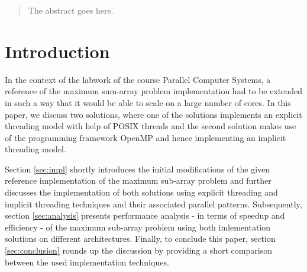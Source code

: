 \documentclass[conference]{IEEEtran}
\begin{document}
\begin{abstract}
The abstract goes here.
\end{abstract}





%
\IEEEpeerreviewmaketitle



\section{Introduction}
In the context of the labwork of the course Parallel Computer Systems, a reference of the maximum sum-array problem implementation had to be extended in such a way that it would be able to scale on a large number of cores. In this paper, we discuss two solutions, where one of the solutions implements an explicit threading model with help of POSIX threads and the second solution makes use of the programming framework OpenMP and hence implementing an implicit threading model. 

Section \ref{sec:impl} shortly introduces the initial modifications of the given reference implementation of the maximum sub-array problem and further discusses the implementation of both solutions using explicit threading and implicit threading techniques and their associated parallel patterns. Subsequently, section \ref{sec:analysis} presents performance analysis - in terms of speedup and efficiency - of the maximum sub-array problem using both imlementation solutions on different architectures. Finally, to conclude this paper, section \ref{sec:conclusion} rounds up the discussion by providing a short comparison between the used implementation techniques. 
\end{document}
